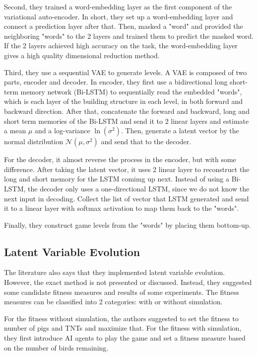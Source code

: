 \documentclass[manuscript,screen,review]{acmart}
\begin{document}
Second, they trained a word-embedding layer as the first component of the variational auto-encoder. In short, they set up a word-embedding layer and connect a prediction layer after that. Then, masked a "word" and provided the neighboring "words" to the 2 layers and trained them to predict the masked word. If the 2 layers achieved high accuracy on the task, the word-embedding layer gives a high quality dimensional reduction method.

Third, they use a sequential VAE to generate levels. A VAE is composed of two parts, encoder and decoder. In encoder, they first use a bidirectional long short-term memory network (Bi-LSTM) to sequentially read the embedded "words", which is each layer of the building structure in each level, in both forward and backward direction. After that, concatenate the forward and backward, long and short term memories of the Bi-LSTM and send it to 2 linear layers and estimate a mean $\mu$ and a log-variance $\ln(\sigma^2)$. Then, generate a latent vector by the normal distribution $\mathcal{N}(\mu,\sigma^2)$ and send that to the decoder.

For the decoder, it almost reverse the process in the encoder, but with some difference. After taking the latent vector, it uses 2 linear layer to reconstruct the long and short memory for the LSTM comimg up next. Instead of using a Bi-LSTM, the decoder only uses a one-directional LSTM, since we do not know the next input in decoding. Collect the list of vector that LSTM generated and send it to a linear layer with softmax activation to map them back to the "words".

Finally, they construct game levels from the "words" by placing them bottom-up.

\subsection{Latent Variable Evolution}

The literature also says that they implemented latent variable evolution. However, the exact method is not presented or discussed. Instead, they suggested some candidate fitness measures and results of some experiments. The fitness measures can be classified into 2 categories: with or without simulation.

For the fitness without simulation, the authors suggested to set the fitness to number of pigs and TNTs and maximize that. For the fitness with simulation, they first introduce AI agents to play the game and set a fitness measure based on the number of birds remaining.
\end{document}
